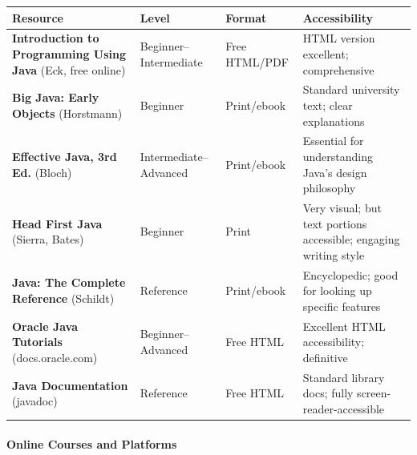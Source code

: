 \documentclass[
  justified,
  openright,
]{tufte-book}
\let\subsection\paragraph
\let\paragraph\paragraph
\let\subsection\paragraph
\let\paragraph\paragraph
\begin{document}
\begin{fullwidth}{\def\LTcaptype{none} %
\begin{longtable}[]{@{}
  >{\raggedright\arraybackslash}p{}
  >{\raggedright\arraybackslash}p{}
  >{\raggedright\arraybackslash}p{}
  >{\raggedright\arraybackslash}p{}@{}}
\toprule\noalign{}
\begin{minipage}[b]{\linewidth}\raggedright
Resource
\end{minipage} & \begin{minipage}[b]{\linewidth}\raggedright
Level
\end{minipage} & \begin{minipage}[b]{\linewidth}\raggedright
Format
\end{minipage} & \begin{minipage}[b]{\linewidth}\raggedright
Accessibility
\end{minipage} \\
\midrule\noalign{}
\endhead
\bottomrule\noalign{}
\endlastfoot
\textbf{Introduction to Programming Using Java} (Eck, free online) &
Beginner--Intermediate & Free HTML/PDF & HTML version excellent;
comprehensive \\
\textbf{Big Java: Early Objects} (Horstmann) & Beginner & Print/ebook &
Standard university text; clear explanations \\
\textbf{Effective Java, 3rd Ed.} (Bloch) & Intermediate--Advanced &
Print/ebook & Essential for understanding Java's design philosophy \\
\textbf{Head First Java} (Sierra, Bates) & Beginner & Print & Very
visual; but text portions accessible; engaging writing style \\
\textbf{Java: The Complete Reference} (Schildt) & Reference &
Print/ebook & Encyclopedic; good for looking up specific features \\
\textbf{Oracle Java Tutorials} (docs.oracle.com) & Beginner--Advanced &
Free HTML & Excellent HTML accessibility; definitive \\
\textbf{Java Documentation} (javadoc) & Reference & Free HTML & Standard
library docs; fully screen-reader-accessible \\
\end{longtable}
}
\end{fullwidth}

\subsection{Online Courses and
Platforms}\label{online-courses-and-platforms-2}
\end{document}
